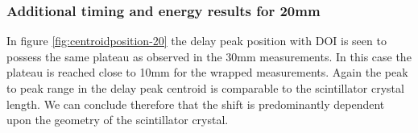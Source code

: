 \subsubsection{Additional timing and energy results for 20mm}
In figure \ref{fig:centroidposition-20} the delay peak position with DOI is seen to possess the same plateau as observed in the 30mm measurements. In this case the plateau is reached close to 10mm for the wrapped measurements. Again the peak to peak range in the delay peak centroid is comparable to the scintillator crystal length. We can conclude therefore that the shift is predominantly dependent upon the geometry of the scintillator crystal. 